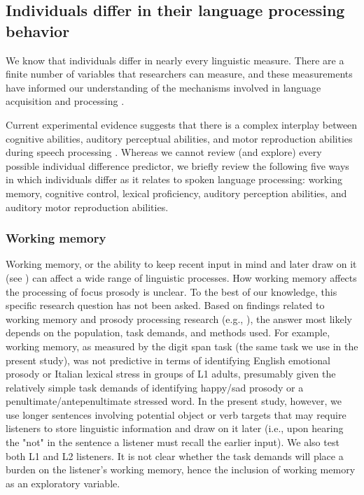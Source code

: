 \subsection{Individuals differ in their language processing behavior}
We know that individuals differ in nearly every linguistic measure. There are a finite number of variables that researchers can measure, and these measurements have informed our understanding of the mechanisms involved in language acquisition and processing \citep{Kidd2018, skehan1991individual, nelson1981individual}. 

Current experimental evidence suggests that there is a complex interplay between cognitive abilities, auditory perceptual abilities, and motor reproduction abilities during speech processing \citep{saito2022does, bramlett_wiener_24_speechprosody, bakkouche2025effects, Kachlicka_Saito_Tierney_2019}. Whereas we cannot review (and explore) every possible individual difference predictor, we briefly review the following five ways in which individuals differ as it relates to spoken language processing: working memory, cognitive control, lexical proficiency, auditory perception abilities, and auditory motor reproduction abilities.


\subsubsection{Working memory}
Working memory, or the ability to keep recent input in mind and later draw on it (see \cite{baddeley2003working,carpenter2013role}) can affect a wide range of linguistic processes. How working memory affects the processing of focus prosody is unclear. To the best of our knowledge, this specific research question has not been asked. Based on findings related to working memory and prosody processing research (e.g., \cite{traxler2009hierarchical,ferreira2015prosody, bishop2021exploring}), the answer most likely depends on the population, task demands, and methods used. For example, working memory, as measured by the digit span task (the same task we use in the present study), was not predictive in terms of identifying English emotional prosody \citep{sinagra2022perception} or Italian lexical stress \citep{ppcc} in groups of L1 adults, presumably given the relatively simple task demands of identifying happy/sad prosody or a penultimate/antepenultimate stressed word. In the present study, however, we use longer sentences involving potential object or verb targets that may require listeners to store linguistic information and draw on it later (i.e., upon hearing the "not" in the sentence a listener must recall the earlier input). We also test both L1 and L2 listeners. It is not clear whether the task demands will place a burden on the listener's working memory, hence the inclusion of working memory as an exploratory variable.


